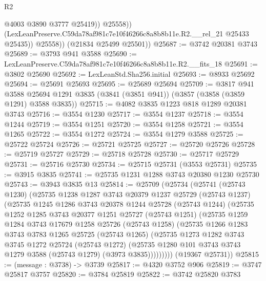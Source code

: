 \begin{lexlean}{R2}
\begin{coremodule}
                    @4003
                    @3890
                    @3777
                    @25419))
                @25558))
            (LexLeanPreserve.C59da78af981c7e10f46266c8a8b8b11e.R2.__rel_21 @25433 @25435))
          @25558))
      (@21834 @25499 @25501))
@25687 := @3742 @20381 @3743
@25689 := @3793 @941 @3588
@25690 := LexLeanPreserve.C59da78af981c7e10f46266c8a8b8b11e.R2.__fits_18
@25691 := @3802 @25690
@25692 := LexLeanStd.Sha256.initial
@25693 := @8933 @25692
@25694 := @25691 @25693
@25695 := @25689 @25694
@25709 := @3817
    @941
    @3588
    @25694
    @1291
    @3835
    (@3841 (@3851 @941))
    (@3857 (@3858 (@3859 @1291) @3588 @3835))
@25715 := @4082 @3835 @1223 @818 @1289 @20381 @3743
@25716 := @3554 @1230
@25717 := @3554 @1237
@25718 := @3554 @1244
@25719 := @3554 @1251
@25720 := @3554 @1258
@25721 := @3554 @1265
@25722 := @3554 @1272
@25724 := @3554 @1279 @3588
@25725 := @25722 @25724
@25726 := @25721 @25725
@25727 := @25720 @25726
@25728 := @25719 @25727
@25729 := @25718 @25728
@25730 := @25717 @25729
@25731 := @25716 @25730
@25734 := @25715 @25731 (@3553 @25731)
@25735 := @3915 @3835
@25741 := @25735 @1231 @1288 @3743 @20380 @1230 @25730
@25743 := @3943 @3835 @13
@25814 := @25709
    (@25734
      (@25741
        (@25743 @1230)
        (@25735
          @1238
          @1287
          @3743
          @20379
          @1237
          @25729
          (@25743 @1237)
          (@25735
            @1245
            @1286
            @3743
            @20378
            @1244
            @25728
            (@25743 @1244)
            (@25735
              @1252
              @1285
              @3743
              @20377
              @1251
              @25727
              (@25743 @1251)
              (@25735
                @1259
                @1284
                @3743
                @17679
                @1258
                @25726
                (@25743 @1258)
                (@25735
                  @1266
                  @1283
                  @3743
                  @3783
                  @1265
                  @25725
                  (@25743 @1265)
                  (@25735
                    @1273
                    @1282
                    @3743
                    @3745
                    @1272
                    @25724
                    (@25743 @1272)
                    (@25735 @1280 @101 @3743 @3743 @1279 @3588 (@25743 @1279) (@3973 @3835)))))))))
      (@19367 @25731))
@25815 := (message : @3738) -> @3739
@25817 := @4320 @3752 @906
@25819 := @3747 @25817 @3757
@25820 := @3784 @25819
@25822 := @3742 @25820 @3783

\end{coremodule}
\end{lexlean}
